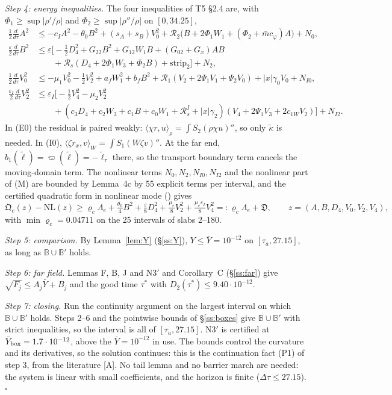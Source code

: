 \documentclass[11pt]{article}
\theoremstyle{definition}
\theoremstyle{remark}
\newcommand{\fn}[1]{\texttt{\detokenize{#1}}}
\newcommand{\tA}{\textnormal{\textsc{[A]}}}
\newcommand{\ip}[2]{\langle #1,#2\rangle}
\newcommand{\abs}[1]{\lvert #1\rvert}
\newcommand{\kt}{\tilde\kappa}
\newcommand{\lt}{\tilde\ell}
\newcommand{\Yb}{\bar Y}
\newcommand{\eps}{\varepsilon}
\newcommand{\cR}{\mathcal R}
\newcommand{\Lam}{\Lambda}
\begin{document}
\emph{Step 4: energy inequalities.} The four inequalities of T5 \S2.4 are, with $\Phi_1\ge\sup\abs{\rho'/\rho}$ and $\Phi_2\ge\sup\abs{\rho''/\rho}$ on $[0,34.25]$,
\begin{align*}
\tfrac12\tfrac d{d\tau}A^2&\le-c_IA^2-\theta_0B^2+(s_A+s_B)V_0^2+\cR_2\bigl(B+2\Phi_1W_1+(\Phi_2+\bar mc_\varphi)A\bigr)+N_0,\tag{E0}\\
\tfrac\eps2\tfrac d{d\tau}B^2&\le\eps\bigl[-\tfrac12D_4^2+G_{22}B^2+G_{12}W_1B+(G_{02}+G_x)AB\\&\qquad+\cR_s(D_4+2\Phi_1W_3+\Phi_2B)+\text{strip}_2\bigr]+N_2,\tag{E2}\\
\tfrac12\tfrac d{d\tau}V_0^2&\le-\mu_1V_0^2-\tfrac12V_2^2+a_fW_1^2+b_fB^2+\cR_1(V_2+2\Psi_1V_1+\Psi_2V_0)+\abs x\gamma_0V_0+N_{I0},\tag{I0}\\
\tfrac{\eps_I}2\tfrac d{d\tau}V_2^2&\le\eps_I\bigl[-\tfrac12V_4^2-\mu_2V_2^2\\&\qquad+(c_3D_4+c_2W_3+c_1B+c_0W_1+\cR^I_s+\abs x\gamma_2)(V_4+2\Psi_1V_3+2c_{1W}V_2)\bigr]+N_{I2}.\tag{I2}
\end{align*}
In (E0) the residual is paired weakly: $\ip{\chi r}u_\rho=\int S_2(\rho\chi u)''$, so only $\kt$ is needed. In (I0), $\ip{\zeta r_x}v_W=\int S_1(W\zeta v)''$. At the far end, $b_1(\lt)=\varpi(\lt)=-\lt_\tau$ there, so the transport boundary term cancels the moving-domain term. The nonlinear terms $N_0,N_2,N_{I0},N_{I2}$ and the nonlinear part of (M) are bounded by Lemma~4c by 55 explicit terms per interval, and the certified quadratic form in nonlinear mode (\fn{closure_cert.py --nl}) gives
\[
\mathfrak Q_c(z)-\mathrm{NL}(z)\ge\varrho_c\Lam_e+\tfrac{\theta_0}4B^2+\tfrac\eps8D_4^2+\tfrac{\mu_e}8V_2^2+\tfrac{\mu_e\eps_I}8V_4^2=:\varrho_c\Lam_e+\mathfrak D,\qquad z=(A,B,D_4,V_0,V_2,V_4),
\]
with $\min\varrho_c=0.04711$ on the 25 intervals of slabs 2--180.

\emph{Step 5: comparison.} By Lemma~\ref{lem:Y} (\S\ref{ss:Y}), $Y\le\Yb=10^{-12}$ on $[\tau_a,27.15]$, as long as $\mathbb B\cup\mathbb B'$ holds.

\emph{Step 6: far field.} Lemmas F, B, J and N3$'$ and Corollary~C (\S\ref{ss:far}) give $\sqrt{F_j}\le A_j\Yb+B_j$ and the good time $\tau^*$ with $D_2(\tau^*)\le9.40\cdot10^{-12}$.

\emph{Step 7: closing.} Run the continuity argument on the largest interval on which $\mathbb B\cup\mathbb B'$ holds. Steps 2--6 and the pointwise bounds of \S\ref{ss:boxes} give $\mathbb B\cup\mathbb B'$ with strict inequalities, so the interval is all of $[\tau_a,27.15]$. N3$'$ is certified at $\Yb_{\rm box}=1.7\cdot10^{-12}$, above the $\Yb=10^{-12}$ in use. The bounds control the curvature and its derivatives, so the solution continues: this is the continuation fact (P1) of step 3, from the literature \tA. No tail lemma and no barrier march are needed: the system is linear with small coefficients, and the horizon is finite ($\Delta\tau\le27.15$).\hfill$\square$
\end{document}
